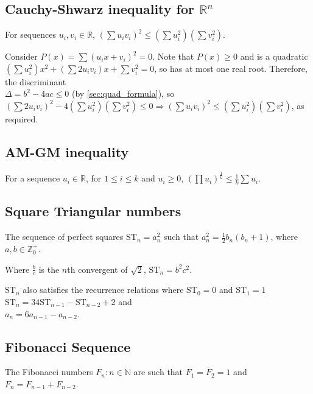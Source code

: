 \documentclass[a4paper,11pt]{article}
\begin{document}
    \subsection{Cauchy-Shwarz inequality for $\mathbb{R}^n$}

    For sequences $u_i, v_i \in \mathbb{R}$,
    $(\sum u_i v_i)^2 \le (\sum u_i^2) (\sum v_i^2)$.

    Consider
    $P(x) = \sum (u_i x + v_i)^2 = 0$. Note that $P(x) \ge 0$ and is a quadratic
    \\$(\sum u_i^2) x^2 + (\sum 2 u_i v_i) x + \sum v_i^2 = 0$, so has
    at most one real root. Therefore, the discriminant
    \\$\Delta = b^2 - 4ac \le 0$ (by \ref{sec:quad_formula}), so
    $(\sum 2 u_i v_i)^2 - 4(\sum u_i^2)(\sum v_i^2) \le 0 \Rightarrow
     (\sum u_i v_i)^2 \le (\sum u_i^2) (\sum v_i^2)$, as required.

    \subsection{AM-GM inequality}

    For a sequence $u_i \in \mathbb{R}$, for $1 \le i \le k$ and $u_i \ge 0$,
    $(\prod u_i)^\frac{1}{k} \le \frac{1}{k}\sum u_i$.

    \subsection{Square Triangular numbers}


    The sequence of perfect squares $\text{ST}_n = a_n^2$
    such that $a_n^2 = \frac 12 b_n(b_n + 1)$, where
    $a, b \in \mathbb{Z}_0^+$.

    Where $\frac{b}{c}$ is the $n$th convergent of $\sqrt 2$,
    $\text{ST}_n = b^2 c^2$.

    $\text{ST}_n$ also satisfies the recurrence relations where
    $\text{ST}_0 = 0$ and $\text{ST}_1 = 1$
    \\$\text{ST}_n = 34\text{ST}_{n - 1} - \text{ST}_{n - 2} + 2$ and
    \\$a_n = 6a_{n - 1} - a_{n - 2}$.

    \subsection{Fibonacci Sequence}

    The Fibonacci numbers $F_n: n \in \mathbb{N}$ are such that $F_1 = F_2 = 1$
    and $F_n = F_{n - 1} + F_{n - 2}$.
\end{document}

